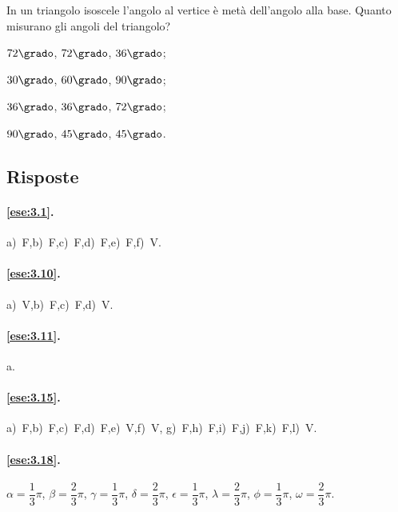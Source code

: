 \pagebreak

\begin{esercizio}
\label{ese:3.117}
In un triangolo isoscele l'angolo al vertice è metà dell'angolo alla 
base. Quanto misurano gli angoli del triangolo?
\begin{multicols}{4}
\begin{enumeratea}
\item \(72\grado\), \(72\grado\), \(36\grado\);
\item \(30\grado\), \(60\grado\), \(90\grado\);
\item \(36\grado\), \(36\grado\), \(72\grado\);
\item \(90\grado\), \(45\grado\), \(45\grado\).
\end{enumeratea}
\end{multicols}
\end{esercizio}


\subsection{Risposte}

\begingroup
\hypersetup{linkcolor=black}

\paragraph{\ref{ese:3.1}.}
a)~F,\quad b)~F,\quad c)~F,\quad d)~F,\quad e)~F,\quad f)~V.

\paragraph{\ref{ese:3.10}.}
a)~V,\quad b)~F,\quad c)~F,\quad d)~V.

\paragraph{\ref{ese:3.11}.}
a.

\paragraph{\ref{ese:3.15}.}
a)~F,\quad b)~F,\quad c)~F,\quad d)~F,\quad e)~V,\quad f)~V,\quad 
g)~F,\quad h)~F,\quad i)~F,\quad j)~F,\quad k)~F,\quad l)~V.

\paragraph{\ref{ese:3.18}.}
\(\alpha=\dfrac{1}{3}\pi\), \(\beta=\dfrac{2}{3}\pi\), 
\(\gamma=\dfrac{1}{3}\pi\), \(\delta=\dfrac{2}{3}\pi\), 
\(\epsilon=\dfrac{1}{3}\pi\), \(\lambda=\dfrac{2}{3}\pi\), 
\(\phi=\dfrac{1}{3}\pi\), \(\omega=\dfrac{2}{3}\pi\).

